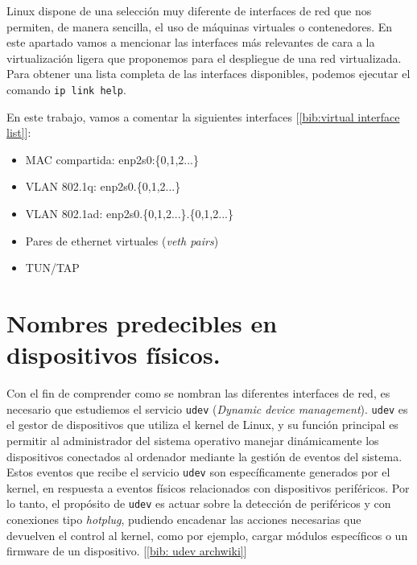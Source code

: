 \documentclass[a4paper, oneside, 12pt]{book}
\begin{document}
	\noindent Linux dispone de una selección muy diferente de interfaces de red que nos permiten, de manera sencilla, el uso de máquinas virtuales o contenedores. En este apartado vamos a mencionar las interfaces más relevantes de cara a la virtualización ligera que proponemos para el despliegue de una red virtualizada. Para obtener una lista completa de las interfaces disponibles, podemos ejecutar el comando \texttt{ip link help}.\\
	
	\par \noindent En este trabajo, vamos a comentar la siguientes interfaces [\ref{bib:virtual interface list}]:
	\begin{itemize}
		\item MAC compartida: enp2s0:\{0,1,2...\}
		\item VLAN 802.1q: enp2s0.\{0,1,2...\}
		\item VLAN 802.1ad: enp2s0.\{0,1,2...\}.\{0,1,2...\}
		\item Pares de ethernet virtuales (\textit{veth pairs})
		\item TUN/TAP
	\end{itemize}


	\section[Nombrado predecible de dispositivos]{Nombres predecibles en dispositivos físicos.}
	\noindent Con el fin de comprender como se nombran las diferentes interfaces de red, es necesario que estudiemos el servicio \texttt{udev} (\textit{Dynamic device management}). \texttt{udev} es el gestor de dispositivos que utiliza el kernel de Linux, y su función principal es permitir al administrador del sistema operativo manejar dinámicamente los dispositivos conectados al ordenador mediante la gestión de eventos del sistema. Estos eventos que recibe el servicio \texttt{udev} son específicamente generados por el kernel, en respuesta a eventos físicos relacionados con dispositivos periféricos. Por lo tanto, el propósito de \texttt{udev} es actuar sobre la detección de periféricos y con conexiones tipo \textit{hotplug}, pudiendo encadenar las acciones necesarias que devuelven el control al kernel, como por ejemplo, cargar módulos específicos o un firmware de un dispositivo. [\ref{bib: udev archwiki}] \\
	
\end{document}
